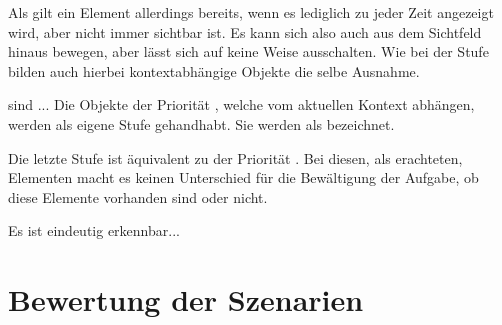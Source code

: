 		Als  gilt ein Element allerdings bereits, wenn es lediglich zu jeder Zeit angezeigt wird, aber nicht immer sichtbar ist. Es kann sich also auch aus dem Sichtfeld hinaus bewegen, aber lässt sich auf keine Weise ausschalten.  Wie bei der Stufe  bilden auch hierbei kontextabhängige Objekte die selbe Ausnahme.
		
		 sind ...
		Die Objekte der Priorität , welche vom aktuellen Kontext abhängen, werden als eigene Stufe gehandhabt. Sie werden als  bezeichnet.
		
		Die letzte Stufe ist äquivalent zu der Priorität . Bei diesen, als  erachteten, Elementen macht es keinen Unterschied für die Bewältigung der Aufgabe, ob diese Elemente vorhanden sind oder nicht.
		
		
		Es ist eindeutig erkennbar...
	
	\section{Bewertung der Szenarien}